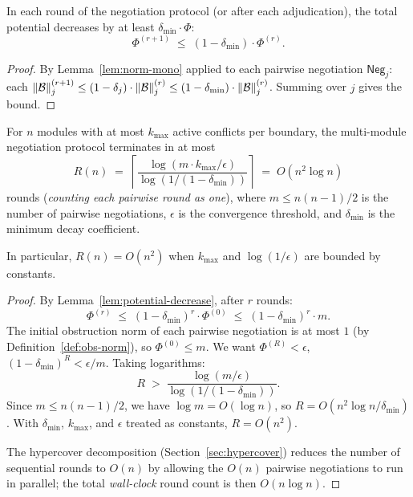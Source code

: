 \documentclass[11pt]{article}
\newcommand{\Neg}{\mathsf{Neg}}           %
\newcommand{\norm}[1]{\lVert #1 \rVert}  %
\newcommand{\ObsNorm}{\norm{\obstr}}      %
\begin{document}
\begin{lemma}\label{lem:potential-decrease}
In each round of the negotiation protocol (or after each adjudication),
the total potential decreases by at least $\delta_{\min} \cdot \Phi$:
\[
  \Phi^{(r+1)} \;\leq\; (1 - \delta_{\min}) \cdot \Phi^{(r)}.
\]
\end{lemma}

\begin{proof}
By Lemma~\ref{lem:norm-mono} applied to each pairwise negotiation $\Neg_j$:
each $\ObsNorm_j^{(r+1)} \leq (1 - \delta_j) \cdot \ObsNorm_j^{(r)}
\leq (1 - \delta_{\min}) \cdot \ObsNorm_j^{(r)}$.
Summing over $j$ gives the bound.
\end{proof}

\begin{theorem}\label{thm:convergence}
For $n$ modules with at most $k_{\max}$ active conflicts per boundary,
the multi-module negotiation protocol terminates in at most
\[
  R(n) \;=\; \left\lceil
    \frac{\log(m \cdot k_{\max} / \epsilon)}{\log(1/(1 - \delta_{\min}))}
  \right\rceil
  \;=\; O(n^2 \log n)
\]
rounds (\emph{counting each pairwise round as one}), where
$m \leq n(n-1)/2$ is the number of pairwise negotiations,
$\epsilon$ is the convergence threshold, and $\delta_{\min}$ is the
minimum decay coefficient.

In particular, $R(n) = O(n^2)$ when $k_{\max}$ and $\log(1/\epsilon)$
are bounded by constants.
\end{theorem}

\begin{proof}
By Lemma~\ref{lem:potential-decrease}, after $r$ rounds:
\[
  \Phi^{(r)} \;\leq\; (1 - \delta_{\min})^r \cdot \Phi^{(0)}
  \;\leq\; (1 - \delta_{\min})^r \cdot m.
\]
The initial obstruction norm of each pairwise negotiation is at most
$1$ (by Definition~\ref{def:obs-norm}), so $\Phi^{(0)} \leq m$.
We want $\Phi^{(R)} < \epsilon$, \ie{}
$(1 - \delta_{\min})^R < \epsilon / m$.
Taking logarithms:
\[
  R \;>\; \frac{\log(m/\epsilon)}{\log(1/(1 - \delta_{\min}))}.
\]
Since $m \leq n(n-1)/2$, we have $\log m = O(\log n)$, so
$R = O(n^2 \log n / \delta_{\min})$.  With $\delta_{\min}$,
$k_{\max}$, and $\epsilon$ treated as constants, $R = O(n^2)$.

The hypercover decomposition (Section~\ref{sec:hypercover}) reduces
the number of sequential rounds to $O(n)$ by allowing the
$O(n)$ pairwise negotiations to run in parallel; the total
\emph{wall-clock} round count is then $O(n \log n)$.
\end{proof}
\end{document}
